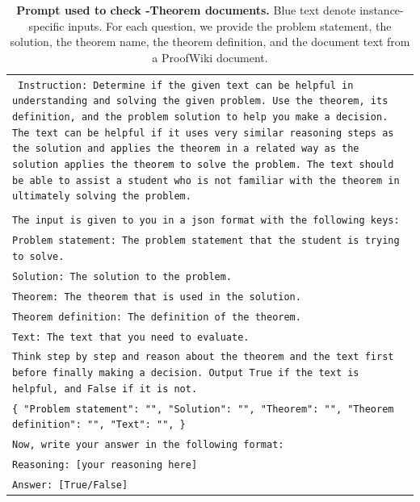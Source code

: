 
\begin{table}[!th]
    \centering
    \small
    \caption{
        \textbf{Prompt used to check \theorem-Theorem documents.} {\color{blue} Blue text} denote instance-specific inputs. 
        For each question, we provide the problem statement, the solution, the theorem name, the theorem definition, and the document text from a ProofWiki document.
    }
    \label{tab:theorem_check}
    \begin{tabular}{>{\raggedright\arraybackslash\tt}p{}<{}}
        \toprule
            \vspace{-1em}
            Instruction: Determine if the given text can be helpful in understanding and solving the given problem. Use the theorem, its definition, and the problem solution to help you make a decision. The text can be helpful if it uses very similar reasoning steps as the solution and applies the theorem in a related way as the solution applies the theorem to solve the problem. The text should be able to assist a student who is not familiar with the theorem in ultimately solving the problem.\\\\

            The input is given to you in a json format with the following keys:\\
            Problem statement: The problem statement that the student is trying to solve.\\
            Solution: The solution to the problem.\\
            Theorem: The theorem that is used in the solution.\\
            Theorem definition: The definition of the theorem.\\
            Text: The text that you need to evaluate.\\

            Think step by step and reason about the theorem and the text first before finally making a decision. Output True if the text is helpful, and False if it is not.
            \\
            {\color{blue}\{
                "Problem statement": "",
                "Solution": "",
                "Theorem": "",
                "Theorem definition": "",
                "Text": "",
            \}}
            \\
            Now, write your answer in the following format:\\
            Reasoning: [your reasoning here]\\
            Answer: [True/False]\\

       \bottomrule
    \end{tabular}
\end{table}
